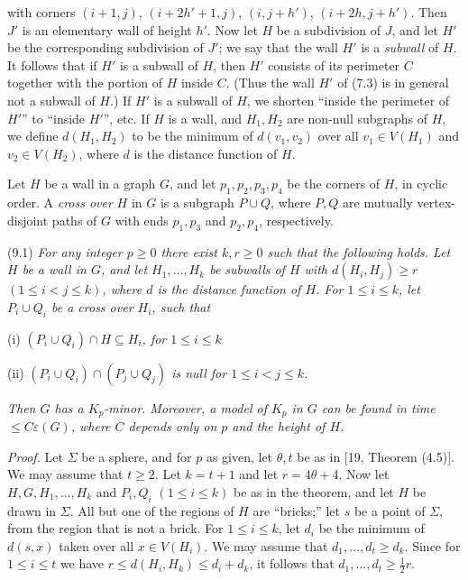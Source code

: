 \noindent with corners $(i+1, j)$, $(i+2h'+1, j)$, $(i, j+h')$, $(i+2h, j+h')$. Then $J'$ is an elementary wall of height $h'$. Now let $H$ be a subdivision of $J$, and let $H'$ be the corresponding subdivision of $J'$; we say that the wall $H'$ is a \textit{subwall} of $H$. It follows that if $H'$ is a subwall of $H$, then $H'$ consists of its perimeter $C$ together with the portion of $H$ inside $C$. (Thus the wall $H'$ of (7.3) is in general not a subwall of $H$.) If $H'$ is a subwall of $H$, we shorten ``inside the perimeter of $H'$'' to ``inside $H'$'', etc. If $H$ is a wall, and $H_1, H_2$ are non-null subgraphs of $H$, we define $d(H_1, H_2)$ to be the minimum of $d(v_1, v_2)$ over all $v_1 \in V(H_1)$ and $v_2 \in V(H_2)$, where $d$ is the distance function of $H$.

Let $H$ be a wall in a graph $G$, and let $p_1, p_2, p_3, p_4$ be the corners of $H$, in cyclic order. A \textit{cross over} $H$ in $G$ is a subgraph $P \cup Q$, where $P, Q$ are mutually vertex-disjoint paths of $G$ with ends $p_1, p_3$ and $p_2, p_4$, respectively.

\stmt
(9.1) \textit{For any integer $p \ge 0$ there exist $k, r \ge 0$ such that the following holds. Let $H$ be a wall in $G$, and let $H_1, \dots, H_k$ be subwalls of $H$ with $d(H_i, H_j) \ge r$ $(1 \le i < j \le k)$, where $d$ is the distance function of $H$. For $1 \le i \le k$, let $P_i \cup Q_i$ be a cross over $H_i$, such that}

\hspace*{12pt}(i) \textit{$(P_i \cup Q_i) \cap H \subseteq H_i$, for $1 \le i \le k$}

\hspace*{12pt}(ii) \textit{$(P_i \cup Q_i) \cap (P_j \cup Q_j)$ is null for $1 \le i < j \le k$.}

\textit{Then $G$ has a $K_p$-minor. Moreover, a model of $K_p$ in $G$ can be found in time $\le C\varepsilon(G)$, where $C$ depends only on $p$ and the height of $H$.}

\textit{Proof.} Let $\Sigma$ be a sphere, and for $p$ as given, let $\theta, t$ be as in [19, Theorem (4.5)]. We may assume that $t \ge 2$. Let $k = t + 1$ and let $r = 4\theta + 4$. Now let $H, G, H_1, \dots, H_k$ and $P_i, Q_i$ $(1 \le i \le k)$ be as in the theorem, and let $H$ be drawn in $\Sigma$. All but one of the regions of $H$ are ``bricks;'' let $s$ be a point of $\Sigma$, from the region that is not a brick. For $1 \le i \le k$, let $d_i$ be the minimum of $d(s, x)$ taken over all $x \in V(H_i)$. We may assume that $d_1, \dots, d_t \ge d_k$. Since for $1 \le i \le t$ we have $r \le d(H_i, H_k) \le d_i + d_k$, it follows that $d_1, \dots, d_t \ge \frac{1}{2}r$.

